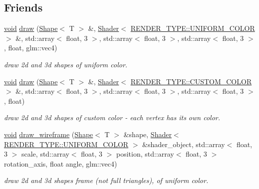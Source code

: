 \subsection*{Friends}
\begin{DoxyCompactItemize}
\item 
\mbox{\hyperlink{glad_8h_a950fc91edb4504f62f1c577bf4727c29}{void}} \mbox{\hyperlink{classShape_a0f7d9c8330ae4f062c6f569a7400e1f0}{draw}} (\mbox{\hyperlink{classShape}{Shape}}$<$ T $>$ \&, \mbox{\hyperlink{classShader}{Shader}}$<$ \mbox{\hyperlink{shader__class_8hpp_a24e288e18eb7b6e01de7565001fedb60aa98862073f71a928bad5099cc3e1c2ed}{R\+E\+N\+D\+E\+R\+\_\+\+T\+Y\+P\+E\+::\+U\+N\+I\+F\+O\+R\+M\+\_\+\+C\+O\+L\+OR}} $>$ \&, std\+::array$<$ float, 3 $>$, std\+::array$<$ float, 3 $>$, std\+::array$<$ float, 3 $>$, float, glm\+::vec4)
\begin{DoxyCompactList}\small\item\em draw 2d and 3d shapes of uniform color. \end{DoxyCompactList}\item 
\mbox{\hyperlink{glad_8h_a950fc91edb4504f62f1c577bf4727c29}{void}} \mbox{\hyperlink{classShape_a29e514c040e0781bfa2e08bcde4a7557}{draw}} (\mbox{\hyperlink{classShape}{Shape}}$<$ T $>$ \&, \mbox{\hyperlink{classShader}{Shader}}$<$ \mbox{\hyperlink{shader__class_8hpp_a24e288e18eb7b6e01de7565001fedb60a9d34355b5a26c54b5dbab1e45245a6f4}{R\+E\+N\+D\+E\+R\+\_\+\+T\+Y\+P\+E\+::\+C\+U\+S\+T\+O\+M\+\_\+\+C\+O\+L\+OR}} $>$ \&, std\+::array$<$ float, 3 $>$, std\+::array$<$ float, 3 $>$, std\+::array$<$ float, 3 $>$, float)
\begin{DoxyCompactList}\small\item\em draw 2d and 3d shapes of custom color -\/ each vertex has it\textquotesingle{}s own color. \end{DoxyCompactList}\item 
\mbox{\hyperlink{glad_8h_a950fc91edb4504f62f1c577bf4727c29}{void}} \mbox{\hyperlink{classShape_ad57e4dd441b60269c43114f31ffa6085}{draw\+\_\+wireframe}} (\mbox{\hyperlink{classShape}{Shape}}$<$ T $>$ \&shape, \mbox{\hyperlink{classShader}{Shader}}$<$ \mbox{\hyperlink{shader__class_8hpp_a24e288e18eb7b6e01de7565001fedb60aa98862073f71a928bad5099cc3e1c2ed}{R\+E\+N\+D\+E\+R\+\_\+\+T\+Y\+P\+E\+::\+U\+N\+I\+F\+O\+R\+M\+\_\+\+C\+O\+L\+OR}} $>$ \&shader\+\_\+object, std\+::array$<$ float, 3 $>$ scale, std\+::array$<$ float, 3 $>$ position, std\+::array$<$ float, 3 $>$ rotation\+\_\+axis, float angle, glm\+::vec4)
\begin{DoxyCompactList}\small\item\em draw 2d and 3d shapes frame (not full triangles), of uniform color. \end{DoxyCompactList}\end{DoxyCompactItemize}


